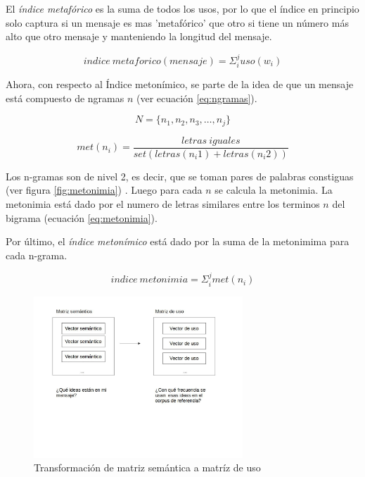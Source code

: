\documentclass[12pt,letterpaper,twoside]{article}
\begin{document}
 El \emph{índice metafórico} es la suma de todos los usos, por lo que el
índice en principio solo captura si un mensaje es mas 'metafórico' que
otro si tiene un número más alto que otro mensaje y manteniendo la
longitud del mensaje.


\begin{equation}
\label{eq:indice_metafórico}
indice\ metaforico(mensaje) =  \Sigma_i^j uso(w_i)
\end{equation}


Ahora, con respecto al Índice metonímico, se parte de la idea de que
un mensaje está compuesto de ngramas \(n\) (ver ecuación
\ref{eq:ngramas}).


\begin{equation}
\label{eq:ngramas}
N = \{n_1, n_2, n_3, \dots , n_j\}
\end{equation}

\begin{equation}
\label{eq:metonimia}
met(n_i) = \frac{letras\ iguales}{ set(letras(n_i1) + letras(n_i2))}
\end{equation}

Los n-gramas son de nivel 2, es decir, que se toman pares de palabras
constiguas (ver figura \ref{fig:metonimia}) .  Luego para cada \(n\) se
calcula la metonimia. La metonimia está dado por el numero de letras
similares entre los terminos \(n\) del bigrama (ecuación
\ref{eq:metonimia}).


Por último, el \emph{índice metonímico} está dado por la suma de la
metonimima para cada n-grama.


\begin{equation}\label{eq:indice_metonimia}
indice\ metonimia = \Sigma_i^j met(n_i)
\end{equation}


\begin{figure}[H]
\centering
\includegraphics[width=0.7\textwidth]{./assets/matrices.jpg}
\caption{\label{fig:matrices}Transformación de matriz semántica a matríz de uso}
\end{figure}
\end{document}
